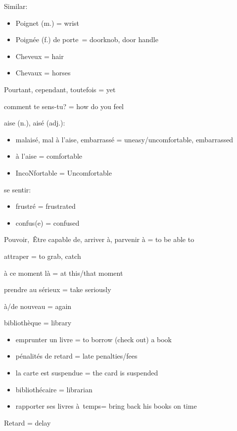 Similar:

\begin{itemize}
\item
  Poignet (m.) = wrist
\item
  Poignée (f.) de porte~= doorknob, door handle~
\item
  Cheveux = hair
\item
  Chevaux = horses
\end{itemize}

Pourtant, cependant, toutefois = yet

comment te sens-tu? = how do you feel

aise (n.), aisé (adj.):

\begin{itemize}
\item
  malaisé, mal à l'aise, embarrassé = uneasy/uncomfortable, embarrassed
\item
  à l'aise = comfortable
\item
  IncoNfortable = Uncomfortable
\end{itemize}

se sentir:

\begin{itemize}
\item
  frustré = frustrated
\item
  confus(e) = confused
\end{itemize}

Pouvoir,~Être capable de, arriver à, parvenir à = to be able to~

attraper = to grab, catch

à ce moment là = at this/that moment

prendre au sérieux = take seriously

à/de nouveau = again

bibliothèque = library

\begin{itemize}
\item
  emprunter un livre = to borrow (check out) a book
\item
  pénalités de retard = late penalties/fees
\item
  la carte est suspendue = the card is suspended
\item
  bibliothécaire = librarian
\item
  rapporter ses livres à~temps= bring back his books on time
\end{itemize}

Retard = delay

